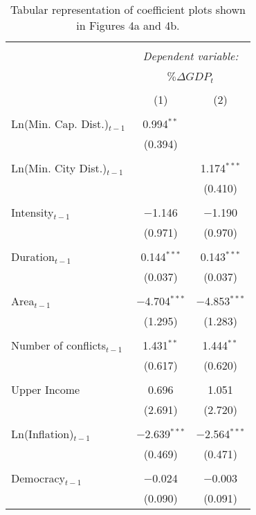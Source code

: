 \begin{table}[!htbp] \centering 
  \caption{Tabular representation of coefficient plots shown in Figures 4a and 4b. }
  \label{tab:capminDistMod} 
\footnotesize{
\begin{tabular}{@{\extracolsep{5pt}}lcc} 
\\[-1.8ex]\hline 
\hline \\[-1.8ex] 
 & \multicolumn{2}{c}{\textit{Dependent variable:}} \\ 
\cline{2-3} 
\\[-1.8ex] & \multicolumn{2}{c}{$\% \Delta GDP_{t}$} \\ 
\\[-1.8ex] & (1) & (2) \\ 
\hline \\[-1.8ex] 
 Ln(Min. Cap. Dist.)$_{t-1}$ & 0.994$^{**}$ &  \\ 
  & (0.394) &  \\ 
  & & \\ 
 Ln(Min. City Dist.)$_{t-1}$ &  & 1.174$^{***}$ \\ 
  &  & (0.410) \\ 
  & & \\ 
 Intensity$_{t-1}$ & $-$1.146 & $-$1.190 \\ 
  & (0.971) & (0.970) \\ 
  & & \\ 
 Duration$_{t-1}$ & 0.144$^{***}$ & 0.143$^{***}$ \\ 
  & (0.037) & (0.037) \\ 
  & & \\ 
 Area$_{t-1}$ & $-$4.704$^{***}$ & $-$4.853$^{***}$ \\ 
  & (1.295) & (1.283) \\ 
  & & \\ 
 Number of conflicts$_{t-1}$ & 1.431$^{**}$ & 1.444$^{**}$ \\ 
  & (0.617) & (0.620) \\ 
  & & \\ 
 Upper Income & 0.696 & 1.051 \\ 
  & (2.691) & (2.720) \\ 
  & & \\ 
 Ln(Inflation)$_{t-1}$ & $-$2.639$^{***}$ & $-$2.564$^{***}$ \\ 
  & (0.469) & (0.471) \\ 
  & & \\ 
 Democracy$_{t-1}$ & $-$0.024 & $-$0.003 \\ 
  & (0.090) & (0.091) \\ 

\end{tabular}}
\end{table}
